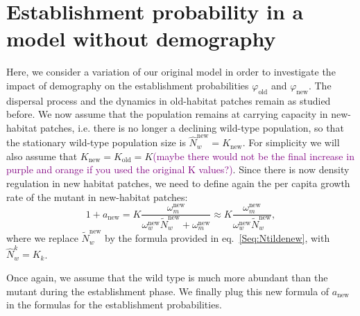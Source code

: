 \documentclass[11pt]{article}
\newcommand{\florence}[1]{\textcolor{purple}{(#1)}} %
\begin{document}
\newpage
\renewcommand{\theequation}{E\arabic{equation}}
\setcounter{equation}{0}  %

\section{Establishment probability in a model without demography}
Here, we consider a variation of our original model in order to investigate the impact of demography on the establishment probabilities $\varphi_{\text{old}}$ and $\varphi_{\text{new}}$. The dispersal process and the dynamics in old-habitat patches remain as studied before. We now assume that the population remains at carrying capacity in new-habitat patches, i.e. there is no longer a declining wild-type population, so that the stationary wild-type population size is $\widehat{N}_w^{\text{new}}=K_{\text{new}}$. For simplicity we will also assume that $K_{\text{new}}=K_{\text{old}}=K$\florence{maybe there would not be the final increase in purple and orange if you used the original K values?}. Since there is now density regulation in new habitat patches, we need to define again the per capita growth rate of the mutant in new-habitat patches: 
\begin{equation}
1+a_{\text{new}} = K \frac{\omega_m^{\text{new}}}{\omega_w^{\text{new}} \widetilde{N}_w^{\text{new}}+ \omega_m^{\text{new}}}\approx K \frac{\omega_m^{\text{new}}}{\omega_w^{\text{new}} \widetilde{N}_w^{\text{new}}},
\end{equation}
where we replace $\widetilde{N}_w^{\text{new}}$ by the formula provided in eq.~\eqref{Seq:Ntildenew}, with $\widehat{N}_w^{k}=K_{k}$.

Once again, we assume that the wild type is much more abundant than the mutant during the establishment phase. We finally plug this new formula of $a_{\text{new}}$ in the formulas for the establishment probabilities. 
\end{document}
